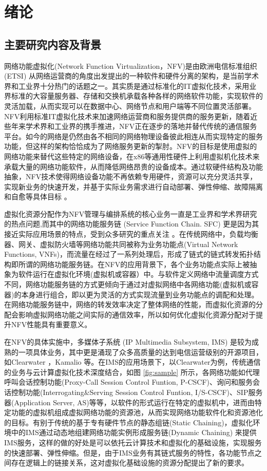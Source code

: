 \chapter{绪论}
\label{chap:Introduction}
\section{主要研究内容及背景}
网络功能虚拟化(Network Function Virtualization，NFV)是由欧洲电信标准组织 (ETSI) 从网络运营商的角度出发提出的一种软件和硬件分离的架构，是当前学术界和工业界十分热门的话题之一。其实质是通过标准化的IT虚拟化技术，采用业界标准的大容量服务器、存储和交换机承载各种各样的网络软件功能，实现软件的灵活加载，从而实现可以在数据中心、网络节点和用户端等不同位置灵活部署。NFV利用标准IT虚拟化技术来加速网络运营商和服务提供商的服务更新，随着近些年来学术界和工业界的携手推进，NFV正在逐步的落地并替代传统的通信服务平台。如今的网络是仍然由各不相同的网络物理设备彼此相连从而实现特定的服务功能，但这样的架构恰恰成为了网络服务更新的掣肘。NFV的目标是使用虚拟的网络功能来替代这些特定的网络设备，在x86等通用性硬件上利用虚拟机化技术来承载大量的网络功能软件，从而降低网络昂贵的设备成本。通过软硬件结构及功能抽象，NFV技术使得网络设备功能不再依赖专用硬件，资源可以充分灵活共享，实现新业务的快速开发，并基于实际业务需求进行自动部署、弹性伸缩、故障隔离和自愈等具体目标 \cite{etsi2013001}。
 
虚拟化资源分配作为NFV管理与编排系统的核心业务一直是工业界和学术界研究的热点问题,而其中的网络功能服务链 (Service Function Chain. SFC) 更是因为其接近实际应用场景的特点，受到众多研究的重点关注 \cite{zave2017dynamic,kulkarni2017nfvnice,mijumbi2016network}。在传统网络中，负载均衡器、网关、虚拟防火墙等网络功能共同被称为业务功能点(Virtual Network Functions, VNFs)，而流量在经过了一系列处理后，形成了链式的链式转发拓扑结构即所谓的网络功能服务链。在NFV的应用背景下，各个业务功能点实际上被抽象为软件运行在虚拟化环境(虚拟机或容器）中。与软件定义网络中流量调度方式不同，网络功能服务链的方式更倾向于通过对虚拟网络中各网络功能(虚拟机或容器)的本身进行组合，即以更为灵活的方式实现流量到业务功能点的调配和处理。在网络功能服务链中，网络的转发效率决定了整体网络的性能，而虚拟化资源的分配会影响虚拟网络功能之间实际的通信效率，所以如何优化虚拟化资源分配对于提升NFV性能具有重要意义。

在NFV的具体实施中，多媒体子系统 (IP Multimedia Subsystem, IMS) 是较为成熟的一项具体业务，其中更是涌现了众多高质量的达到电信运营级别的开源项目，如Clearwater \cite{clearwater}，Kamalio \cite{kamalio}等。在IMS的应用场景下，以Clearwater为例，传统通信的业务与云计算虚拟化技术深度结合，如图 \ref{fig:sample} 所示，各网络功能如代理呼叫会话控制功能(Proxy-Call Session Control Funtion, P-CSCF)、询问和服务会话控制功能(Interrogating\&Serving Session Control Funtion, I/S-CSCF)、SIP服务器(Application Server, AS)等等，以软件的形式运行在特定的虚拟机中，进而由特定功能的虚拟机组成虚拟网络功能的资源池，从而实现网络功能软件化和资源池化的目标。有别于传统的基于专有硬件节点的静态组链(Static Chaining)，虚拟化环境中的IMS通过动态地组建网络功能实例形成服务链(Dynamic Chaining) 来提供IMS服务，这样的做的好处是可以依托云计算技术和虚拟化的基础设施，实现服务的快速部署、弹性伸缩。但是，由于IMS业务有其链式服务的特性，各功能节点之间存在逻辑上的链接关系，这对虚拟化基础设施的资源分配提出了新的要求。

